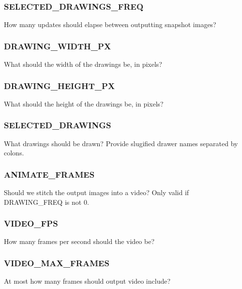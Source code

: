 \subsubsection{SELECTED\_DRAWINGS\_FREQ}


How many updates should elapse between outputting snapshot images?

\subsubsection{DRAWING\_WIDTH\_PX}


What should the width of the drawings be, in pixels?

\subsubsection{DRAWING\_HEIGHT\_PX}


What should the height of the drawings be, in pixels?

\subsubsection{SELECTED\_DRAWINGS}


What drawings should be drawn?
Provide slugified drawer names separated by colons.

\subsubsection{ANIMATE\_FRAMES}


Should we stitch the output images into a video?
Only valid if DRAWING\_FREQ is not 0.

\subsubsection{VIDEO\_FPS}


How many frames per second should the video be?

\subsubsection{VIDEO\_MAX\_FRAMES}


At most how many frames should output video include?
